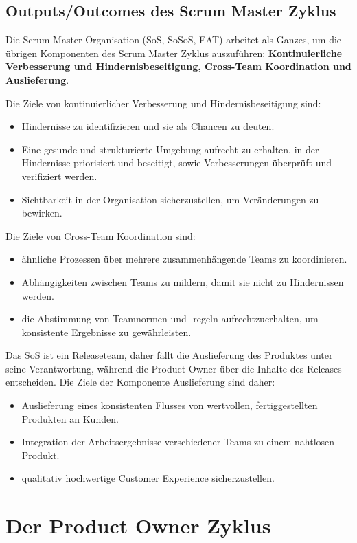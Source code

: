 \documentclass[12pt,a4paper,parskip=full]{scrartcl}
\begin{document}
\subsection{Outputs/Outcomes des Scrum Master Zyklus}
Die Scrum Master Organisation (SoS, SoSoS, EAT) arbeitet als Ganzes, um die
übrigen Komponenten des Scrum Master Zyklus auszuführen: \textbf{Kontinuierliche Verbesserung
und Hindernisbeseitigung, Cross-Team Koordination und Auslieferung}.

Die Ziele von kontinuierlicher Verbesserung und Hindernisbeseitigung sind:
\begin{itemize}
\item Hindernisse zu identifizieren und sie als Chancen zu deuten.
\item Eine gesunde und strukturierte Umgebung aufrecht zu erhalten, in der
Hindernisse priorisiert und beseitigt, sowie Verbesserungen überprüft
und verifiziert werden.
\item Sichtbarkeit in der Organisation sicherzustellen, um Veränderungen zu bewirken.
\end{itemize}
Die Ziele von Cross-Team Koordination sind:
\begin{itemize}
\item ähnliche Prozessen über mehrere zusammenhängende Teams zu koordinieren.
\item Abhängigkeiten zwischen Teams zu mildern, damit sie nicht zu Hindernissen werden.
\item die Abstimmung von Teamnormen und -regeln aufrechtzuerhalten, um konsistente
Ergebnisse zu gewährleisten.
\end{itemize}

Das SoS ist ein Releaseteam, daher fällt die Auslieferung des Produktes unter
seine Verantwortung, während die Product Owner über die Inhalte des Releases
entscheiden. Die Ziele der Komponente Auslieferung sind daher:

\begin{itemize}
\item Auslieferung eines konsistenten Flusses von wertvollen, fertiggestellten Produkten an Kunden.
\item Integration der Arbeitsergebnisse verschiedener Teams zu einem nahtlosen Produkt.
\item qualitativ hochwertige Customer Experience sicherzustellen.
\end{itemize}

\section{Der Product Owner Zyklus}
\end{document}
